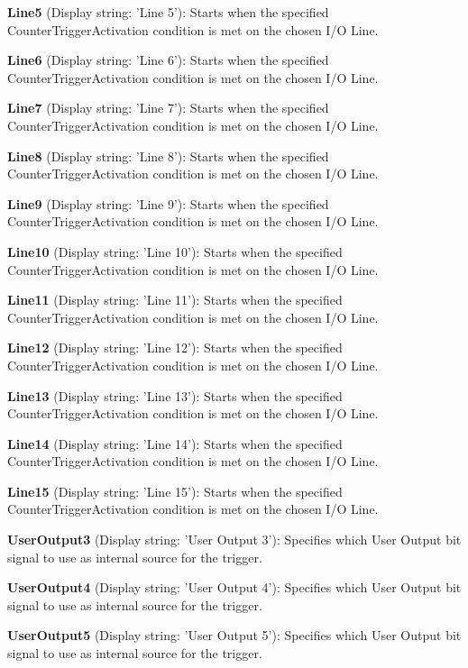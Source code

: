 \begin{DoxyItemize}
\item {\bfseries Line5} (Display string\+: 'Line 5')\+: Starts when the specified Counter\+Trigger\+Activation condition is met on the chosen I/\+O Line.
\item {\bfseries Line6} (Display string\+: 'Line 6')\+: Starts when the specified Counter\+Trigger\+Activation condition is met on the chosen I/\+O Line.
\item {\bfseries Line7} (Display string\+: 'Line 7')\+: Starts when the specified Counter\+Trigger\+Activation condition is met on the chosen I/\+O Line.
\item {\bfseries Line8} (Display string\+: 'Line 8')\+: Starts when the specified Counter\+Trigger\+Activation condition is met on the chosen I/\+O Line.
\item {\bfseries Line9} (Display string\+: 'Line 9')\+: Starts when the specified Counter\+Trigger\+Activation condition is met on the chosen I/\+O Line.
\item {\bfseries Line10} (Display string\+: 'Line 10')\+: Starts when the specified Counter\+Trigger\+Activation condition is met on the chosen I/\+O Line.
\item {\bfseries Line11} (Display string\+: 'Line 11')\+: Starts when the specified Counter\+Trigger\+Activation condition is met on the chosen I/\+O Line.
\item {\bfseries Line12} (Display string\+: 'Line 12')\+: Starts when the specified Counter\+Trigger\+Activation condition is met on the chosen I/\+O Line.
\item {\bfseries Line13} (Display string\+: 'Line 13')\+: Starts when the specified Counter\+Trigger\+Activation condition is met on the chosen I/\+O Line.
\item {\bfseries Line14} (Display string\+: 'Line 14')\+: Starts when the specified Counter\+Trigger\+Activation condition is met on the chosen I/\+O Line.
\item {\bfseries Line15} (Display string\+: 'Line 15')\+: Starts when the specified Counter\+Trigger\+Activation condition is met on the chosen I/\+O Line.
\item {\bfseries User\+Output3} (Display string\+: 'User Output 3')\+: Specifies which User Output bit signal to use as internal source for the trigger.
\item {\bfseries User\+Output4} (Display string\+: 'User Output 4')\+: Specifies which User Output bit signal to use as internal source for the trigger.
\item {\bfseries User\+Output5} (Display string\+: 'User Output 5')\+: Specifies which User Output bit signal to use as internal source for the trigger.

\end{DoxyItemize}

